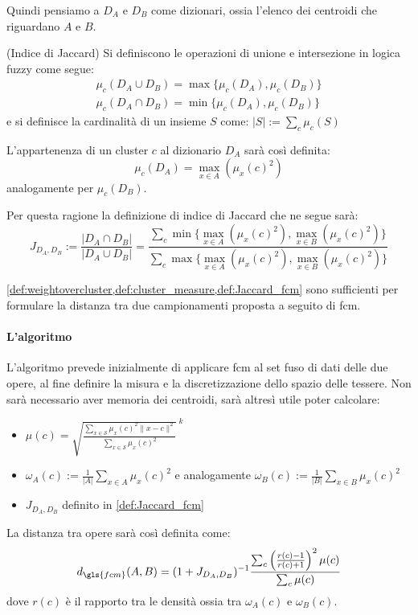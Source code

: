 \noindent Quindi pensiamo a $D_A$ e $D_B$ come dizionari, ossia l'elenco dei centroidi che riguardano $A$ e $B$.
\begin{definition}(Indice di Jaccard)
	\label{def:Jaccard_fcm}
	Si definiscono le operazioni di unione e intersezione in logica fuzzy come segue:
	\begin{align*}
	\mu_c(D_A\cup D_B) = \max\{\mu_c(D_A),\mu_c(D_B)\} \\
	\mu_c(D_A\cap D_B) = \min\{\mu_c(D_A),\mu_c(D_B)\}
	\end{align*}
	e si definisce la cardinalità di un insieme $S$ come: $|S|:=\sum_c \mu_c(S)$

	\noindent L'appartenenza di un cluster $c$ al dizionario $D_A$ sarà così definita:
	\begin{equation}
		\mu_c(D_A) = \max_{x\in A}(\mu_x(c)^2)
	\end{equation}
	analogamente per $\mu_c(D_B)$.

	\noindent Per questa ragione la definizione di indice di Jaccard che ne segue sarà:
	\begin{equation}
		J_{D_A,D_B} := \frac{|D_A \cap D_B|}{|D_A \cup D_B|} = \frac{\sum_c \min\{\max_{x\in A}(\mu_x(c)^2),\max_{x\in B}(\mu_x(c)^2)\}}{\sum_c \max\{\max_{x\in A}(\mu_x(c)^2),\max_{x\in B}(\mu_x(c)^2)\}}
	\end{equation}
\end{definition}

\noindent \cref{def:weightovercluster,def:cluster_measure,def:Jaccard_fcm} sono sufficienti per formulare la distanza tra due campionamenti proposta a seguito di \gls{fcm}.


\paragraph{L'algoritmo}
L'algoritmo prevede inizialmente di applicare \gls{fcm} al set fuso di dati delle due opere, al fine definire la misura e la discretizzazione dello spazio delle tessere. Non sarà necessario aver memoria dei centroidi, sarà altresì utile poter calcolare:
\begin{itemize}
	\item $ \mu(c) = {\sqrt{\frac{\sum_{x\in\mathcal{S}} \mu_x(c)^2 \|x-c\|^2}{\sum_{x\in\mathcal{S}}\mu_x(c)^2}}\,}^k $
	\item $ \omega_A(c) := \frac{1}{|A|}\sum_{x\in A} \mu_x(c)^2 $ e analogamente $ \omega_B(c) := \frac{1}{|B|}\sum_{x\in B} \mu_x(c)^2 $
	\item $ J_{D_A, D_B} $ definito in \cref{def:Jaccard_fcm}
\end{itemize}
La distanza tra opere sarà così definita come:
\begin{equation}
\label{eq:fuzzy_distance}
	d_{\gls{fcm}}(A, B) = (1 + J_{D_A, D_B})^{-1}\frac{\sum_c \left(\frac{r(c)-1}{r(c)+1}\right)^2 \mu(c)}{\sum_c \mu(c)}
\end{equation}
dove $r(c)$ è il rapporto tra le densità ossia tra $\omega_A(c)$ e $\omega_B(c)$.

